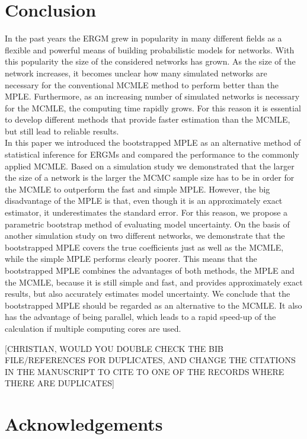 \documentclass[10pt, conference, compsocconf]{IEEEtran}
\begin{document}
\section{Conclusion}
\noindent In the past years the ERGM grew in popularity in many different fields as a flexible and powerful means of building probabilistic models for networks. With this popularity the size of the considered networks has grown. As the size of the network increases, it becomes unclear how many simulated networks are necessary for the conventional MCMLE method to perform better than the MPLE. Furthermore, as an increasing number of simulated networks is necessary for the MCMLE, the computing time rapidly grows. For this reason it is essential to develop different methods that provide faster estimation than the MCMLE, but still lead to reliable results.\\
In this paper we introduced the bootstrapped MPLE as an alternative method of statistical inference for ERGMs and compared the performance to the commonly applied MCMLE. Based on a simulation study we demonstrated that the larger the size of a network is the larger the MCMC sample size has to be in order for the MCMLE to outperform the fast and simple MPLE. However, the big disadvantage of the MPLE is that, even though it is an approximately exact estimator, it underestimates the standard error. For this reason, we propose a parametric bootstrap method of evaluating model uncertainty. On the basis of another simulation study on two different networks, we demonstrate that the bootstrapped MPLE covers the true coefficients just as well as the MCMLE, while the simple MPLE performs clearly poorer. This means that the bootstrapped MPLE combines the advantages of both methods, the MPLE and the MCMLE, because it is still simple and fast, and provides approximately exact results, but also accurately estimates model uncertainty. We conclude that the bootstrapped MPLE should be regarded as an alternative to the MCMLE. It also has the advantage of being parallel, which leads to a rapid speed-up of the calculation if multiple computing cores are used.

[CHRISTIAN, WOULD YOU DOUBLE CHECK THE BIB FILE/REFERENCES FOR DUPLICATES, AND CHANGE THE CITATIONS IN THE MANUSCRIPT TO CITE TO ONE OF THE RECORDS WHERE THERE ARE DUPLICATES]

\section{Acknowledgements}
\end{document}
